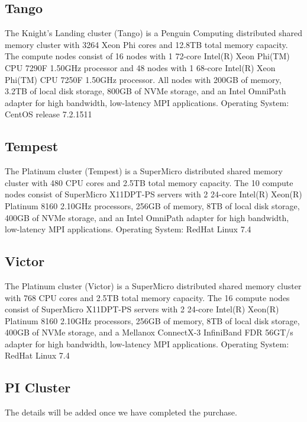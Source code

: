 \subsection{Tango}

The Knight’s Landing cluster (Tango) is a Penguin Computing
distributed shared memory cluster with 3264 Xeon Phi cores and 12.8TB
total memory capacity. The compute nodes consist of 16 nodes with 1
72-core Intel(R) Xeon Phi(TM) CPU 7290F 1.50GHz processor and 48 nodes
with 1 68-core Intel(R) Xeon Phi(TM) CPU 7250F 1.50GHz processor. All
nodes with 200GB of memory, 3.2TB of local disk storage, 800GB of NVMe
storage, and an Intel OmniPath adapter for high bandwidth, low-latency
MPI applications. Operating System: CentOS release 7.2.1511

\subsection{Tempest}

The Platinum cluster (Tempest) is a SuperMicro distributed shared
memory cluster with 480 CPU cores and 2.5TB total memory capacity. The
10 compute nodes consist of SuperMicro X11DPT-PS servers with 2
24-core Intel(R) Xeon(R) Platinum 8160 2.10GHz processors, 256GB of
memory, 8TB of local disk storage, 400GB of NVMe storage, and an Intel
OmniPath adapter for high bandwidth, low-latency MPI
applications. Operating System: RedHat Linux 7.4

\subsection{Victor}

The Platinum cluster (Victor) is a SuperMicro distributed shared
memory cluster with 768 CPU cores and 2.5TB total memory capacity. The
16 compute nodes consist of SuperMicro X11DPT-PS servers with 2
24-core Intel(R) Xeon(R) Platinum 8160 2.10GHz processors, 256GB of
memory, 8TB of local disk storage, 400GB of NVMe storage, and a
Mellanox ConnectX-3 InfiniBand FDR 56GT/s adapter for high bandwidth,
low-latency MPI applications. Operating System: RedHat Linux 7.4

\subsection{PI Cluster}

The details will be added once we have completed the purchase.
